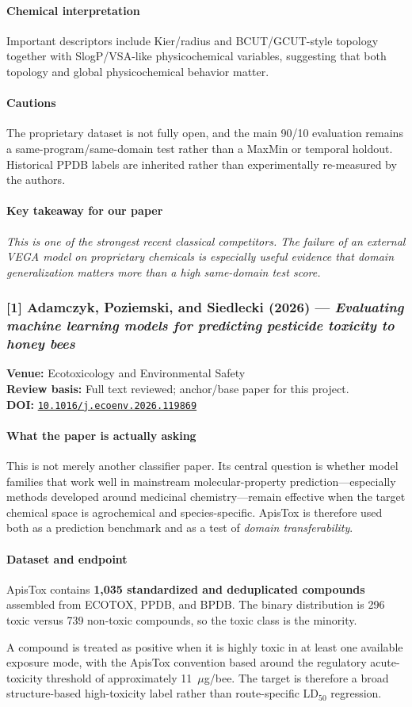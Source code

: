 \documentclass[11pt]{article}
\newcommand{\reviewfield}[2]{\paragraph{#1}#2}
\newcommand{\keytakeaway}[1]{\paragraph{Key takeaway for our paper}\emph{#1}}
\newcommand{\paperdoi}[1]{\href{https://doi.org/#1}{\texttt{#1}}}
\begin{document}
\reviewfield{Chemical interpretation}{
Important descriptors include Kier/radius and BCUT/GCUT-style topology together with SlogP/VSA-like physicochemical variables, suggesting that both topology and global physicochemical behavior matter.
}

\reviewfield{Cautions}{
The proprietary dataset is not fully open, and the main 90/10 evaluation remains a same-program/same-domain test rather than a MaxMin or temporal holdout. Historical PPDB labels are inherited rather than experimentally re-measured by the authors.
}

\keytakeaway{This is one of the strongest recent classical competitors. The failure of an external VEGA model on proprietary chemicals is especially useful evidence that domain generalization matters more than a high same-domain test score.}


\subsubsection{[1] Adamczyk, Poziemski, and Siedlecki (2026) --- \textit{Evaluating machine learning models for predicting pesticide toxicity to honey bees}}
\textbf{Venue:} Ecotoxicology and Environmental Safety\\
\textbf{Review basis:} Full text reviewed; anchor/base paper for this project.\\
\textbf{DOI:} \paperdoi{10.1016/j.ecoenv.2026.119869}

\reviewfield{What the paper is actually asking}{
This is not merely another classifier paper. Its central question is whether model families that work well in mainstream molecular-property prediction---especially methods developed around medicinal chemistry---remain effective when the target chemical space is agrochemical and species-specific. ApisTox is therefore used both as a prediction benchmark and as a test of \emph{domain transferability}.
}

\reviewfield{Dataset and endpoint}{
ApisTox contains \textbf{1,035 standardized and deduplicated compounds} assembled from ECOTOX, PPDB, and BPDB. The binary distribution is 296 toxic versus 739 non-toxic compounds, so the toxic class is the minority.

A compound is treated as positive when it is highly toxic in at least one available exposure mode, with the ApisTox convention based around the regulatory acute-toxicity threshold of approximately 11~$\mu$g/bee. The target is therefore a broad structure-based high-toxicity label rather than route-specific LD$_{50}$ regression.
}
\end{document}
